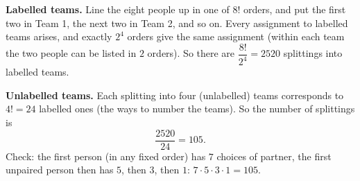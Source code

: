 \textbf{Labelled teams.} Line the eight people up in one of $8!$ orders, and put the first two in Team 1, the next two in Team 2, and so on. Every assignment to labelled teams arises, and exactly $2^4$ orders give the same assignment (within each team the two people can be listed in $2$ orders). So there are $\dfrac{8!}{2^4}=2520$ splittings into labelled teams.

\textbf{Unlabelled teams.} Each splitting into four (unlabelled) teams corresponds to $4!=24$ labelled ones (the ways to number the teams). So the number of splittings is
\[
\dfrac{2520}{24}=\boxed{105}.
\]
Check: the first person (in any fixed order) has $7$ choices of partner, the first unpaired person then has $5$, then $3$, then $1$: $7\cdot5\cdot3\cdot1=105$.
